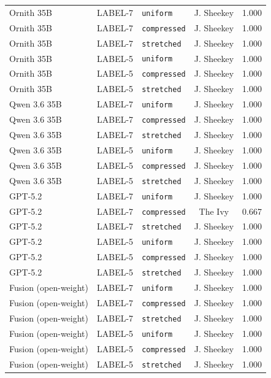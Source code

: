 \begin{table}[htbp]
{\begin{tabular}{lllcc}
  Ornith 35B & LABEL-7 & \texttt{uniform} & J. Sheekey & 1.000 \\
  Ornith 35B & LABEL-7 & \texttt{compressed} & J. Sheekey & 1.000 \\
  Ornith 35B & LABEL-7 & \texttt{stretched} & J. Sheekey & 1.000 \\
  Ornith 35B & LABEL-5 & \texttt{uniform} & J. Sheekey & 1.000 \\
  Ornith 35B & LABEL-5 & \texttt{compressed} & J. Sheekey & 1.000 \\
  Ornith 35B & LABEL-5 & \texttt{stretched} & J. Sheekey & 1.000 \\
  Qwen 3.6 35B & LABEL-7 & \texttt{uniform} & J. Sheekey & 1.000 \\
  Qwen 3.6 35B & LABEL-7 & \texttt{compressed} & J. Sheekey & 1.000 \\
  Qwen 3.6 35B & LABEL-7 & \texttt{stretched} & J. Sheekey & 1.000 \\
  Qwen 3.6 35B & LABEL-5 & \texttt{uniform} & J. Sheekey & 1.000 \\
  Qwen 3.6 35B & LABEL-5 & \texttt{compressed} & J. Sheekey & 1.000 \\
  Qwen 3.6 35B & LABEL-5 & \texttt{stretched} & J. Sheekey & 1.000 \\
  GPT-5.2 & LABEL-7 & \texttt{uniform} & J. Sheekey & 1.000 \\
  GPT-5.2 & LABEL-7 & \texttt{compressed} & The Ivy & 0.667 \\
  GPT-5.2 & LABEL-7 & \texttt{stretched} & J. Sheekey & 1.000 \\
  GPT-5.2 & LABEL-5 & \texttt{uniform} & J. Sheekey & 1.000 \\
  GPT-5.2 & LABEL-5 & \texttt{compressed} & J. Sheekey & 1.000 \\
  GPT-5.2 & LABEL-5 & \texttt{stretched} & J. Sheekey & 1.000 \\
  Fusion (open-weight) & LABEL-7 & \texttt{uniform} & J. Sheekey & 1.000 \\
  Fusion (open-weight) & LABEL-7 & \texttt{compressed} & J. Sheekey & 1.000 \\
  Fusion (open-weight) & LABEL-7 & \texttt{stretched} & J. Sheekey & 1.000 \\
  Fusion (open-weight) & LABEL-5 & \texttt{uniform} & J. Sheekey & 1.000 \\
  Fusion (open-weight) & LABEL-5 & \texttt{compressed} & J. Sheekey & 1.000 \\
  Fusion (open-weight) & LABEL-5 & \texttt{stretched} & J. Sheekey & 1.000 \\
\bottomrule
\end{tabular}%
}
\end{table}
